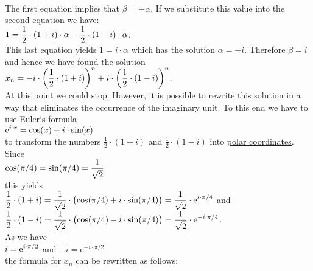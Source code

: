 \\[0.2cm]
The first equation implies that $\beta = -\alpha$.  If we substitute this value into the second equation we have:
\\[0.2cm]
\hspace*{1.3cm}
$\displaystyle 1 = \frac{1}{2} \cdot (1 + i) \cdot \alpha - \frac{1}{2} \cdot (1 - i) \cdot \alpha$.
\\[0.2cm]
This last equation yields $1 = i \cdot \alpha$ which has the solution $\alpha = -i$.  Therefore $\beta = i$
and hence we have found the solution
\\[0.2cm]
\hspace*{1.3cm}
$\displaystyle x_n = -i \cdot \left(\frac{1}{2} \cdot (1 + i)\right)^n + i \cdot \left(\frac{1}{2} \cdot (1 - i)\right)^n$.
\\[0.2cm]
At this point we could stop.  However, it is possible to rewrite this solution in a way that eliminates the
occurrence of the imaginary unit.  To this end we have to use
\href{https://en.wikipedia.org/wiki/Euler%27s_formula}{Euler`s formula} 
\\[0.2cm]
\hspace*{1.3cm}
$\displaystyle \mathrm{e}^{i \cdot x} = \cos(x) + i \cdot \sin(x)$
\\[0.2cm]
to transform the numbers
$\frac{1}{2} \cdot (1 + i)$ and $\frac{1}{2} \cdot (1 - i)$ into
\href{https://en.wikipedia.org/wiki/Polar_coordinate_system#Complex_numbers}{polar coordinates}.  Since
\\[0.2cm]
\hspace*{1.3cm}
$\displaystyle \cos(\pi/4) = \sin(\pi/4) = \frac{1}{\sqrt{2}}$
\\[0.2cm]
this yields
\\[0.2cm]
\hspace*{1.3cm}
$\displaystyle \frac{1}{2} \cdot (1 + i) = \frac{1}{\sqrt{2}} \cdot \bigl(\cos(\pi/4) + i \cdot \sin(\pi/4) \bigr) =
 \frac{1}{\sqrt{2}} \cdot \mathrm{e}^{i \cdot\pi/4}$ \quad and 
\\[0.2cm]
\hspace*{1.3cm}
$\displaystyle \frac{1}{2} \cdot (1 - i) = \frac{1}{\sqrt{2}} \cdot \bigl(\cos(\pi/4) - i \cdot \sin(\pi/4) \bigr) =
 \frac{1}{\sqrt{2}} \cdot \mathrm{e}^{-i \cdot\pi/4}$. 
\\[0.2cm]
As we have 
\\[0.2cm]
\hspace*{1.3cm}
$\displaystyle i = \mathrm{e}^{i \cdot\pi/2}$  \quad and \quad $-i = \mathrm{e}^{-i \cdot\pi/2}$
\\[0.2cm]
the formula for $x_n$ can be rewritten as follows:
